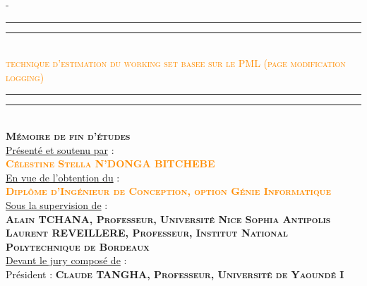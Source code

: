 \begin{titlingpage}
\begin{SingleSpace}
\begin{adjustwidth*}{\unitlength}{-\unitlength}
\vspace{0.3cm}
\begin{center}
\textcolor{darkorange}{\rule[0.5ex]{\linewidth}{2pt}\vspace*{-\baselineskip}\vspace*{2.5pt}}
\textcolor{darkorange}{\rule[0.5ex]{\linewidth}{1pt}}\\[3mm]
{\Large {\textcolor{darkorange}{\textsc{ technique d'estimation du working set basee sur le PML (page modification logging) }}
} }\\[2mm]
\textcolor{darkorange}{\rule[0.5ex]{\linewidth}{1pt}\vspace*{-\baselineskip}\vspace{3.2pt}}
\textcolor{darkorange}{\rule[0.5ex]{\linewidth}{2pt}}\\[3mm]
{\large \textbf{\textsc{Mémoire de fin d’études}}}\\
\vspace{4mm}
{\underline{Présenté et soutenu par} :} \\
\vspace{3mm}
{\large \textsc{\textbf{\textcolor{darkorange}{Célestine Stella N'DONGA BITCHEBE}}}}\\
\vspace{4.5mm}
{\underline{En vue de l'obtention du} :} \\
\vspace{3mm}
{\large \textsc{\textbf{\textcolor{darkorange}{Diplôme d’Ingénieur de Conception, option Génie Informatique}}}}\\
\vspace{4mm}
{\underline{Sous la supervision de} :}\\
\vspace{4mm}
{\normalsize \textsc{\textbf{Alain TCHANA, Professeur, Université Nice Sophia Antipolis}}}\\
\vspace{3mm}
{\normalsize \textsc{\textbf{Laurent REVEILLERE, Professeur, Institut National Polytechnique de Bordeaux}}}\\
\vspace{4mm}
{\underline{Devant le jury composé de} :} \\
\vspace{4mm}
{\Large Président :} \textbf{{\large \textsc{Claude TANGHA, Professeur, Université de Yaoundé I}}} \\ 
\vspace{4mm}


\end{center}
\end{adjustwidth*}
\end{SingleSpace}
\end{titlingpage}
